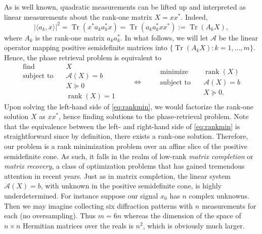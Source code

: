 \documentclass[conference,onecolumn,12pt]{IEEEtran}
\newcommand{\cA}{\mathcal{A}}
\newcommand{\<}{\langle}
\renewcommand{\>}{\rangle}
\newcommand{\trace}{\operatorname{Tr}}
\newcommand{\rank}{\operatorname{rank}}
\numberwithin{equation}{section}
\begin{document}
As is well known, quadratic measurements can be lifted up and
interpreted as linear measurements about the rank-one matrix $X = x
x^*$. Indeed,
\[
|\<a_k, x\>|^2 = \trace(x^* a_k a_k^* x) = \trace(a_k a_k^* x x^*) :=
\trace(A_k X),
\]
where $A_k$ is the rank-one matrix $a_k a_k^*$. %
In what follows, we
will let $\cA$ be the linear operator mapping positive semidefinite
matrices into $\{\trace(A_k X) : k = 1,\ldots, m\}$.  Hence, the phase
retrieval problem is equivalent to
\begin{equation}
\label{eq:rankmin}
  \begin{array}{ll}
    \text{find}   & \quad X\\ 
    \text{subject to} & \quad  \cA(X) = b\\
& \quad X \succeq 0\\
& \quad \rank(X) = 1
\end{array} 
\qquad \Leftrightarrow \qquad 
  \begin{array}{ll}
    \text{minimize}   & \quad \rank(X)\\ 
    \text{subject to} & \quad  \cA(X) = b\\
& \quad X \succeq 0. 
\end{array}
\end{equation}
Upon solving the left-hand side of \eqref{eq:rankmin}, we would
factorize the rank-one solution $X$ as $x x^*$, hence finding
solutions to the phase-retrieval problem. Note that the equivalence
between the left- and right-hand side of \eqref{eq:rankmin} is
straightforward since by definition, there exists a rank-one solution.
Therefore, our problem is a rank minimization problem over an affine
slice of the positive semidefinite cone. As such, it falls in the
realm of low-rank {\em matrix completion} or {\em matrix recovery}, a
class of optimization problems that has gained tremendous attention in
recent years. Just as in matrix
completion, the linear system $\cA(X) = b$, with unknown in the
positive semidefinite cone, is highly underdetermined. For instance
suppose our signal $x_0$ has $n$ complex unknowns. Then we may imagine
collecting six diffraction patterns with $n$ measurements for each (no
oversampling). Thus $m = 6n$ whereas the dimension of the space of $n
\times n$ Hermitian matrices over the reals is $n^2$, which is
obviously much larger.
\end{document}

